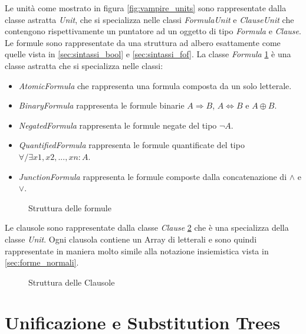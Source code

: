 \documentclass[./main.tex]{subfiles}
\begin{document}
Le unità come mostrato in figura \ref{fig:vampire_units} sono rappresentate dalla classe astratta \textit{Unit},
che si specializza nelle classi \textit{FormulaUnit} e \textit{ClauseUnit} che contengono rispettivamente un 
puntatore ad un oggetto di tipo \textit{Formula} e \textit{Clause}.
Le formule sono rappresentate da una struttura ad albero esattamente come quelle vista in \ref{sec:sintassi_bool} e \ref{sec:sintassi_fof}.
La classe \textit{Formula} \ref{fig:vampire_formulas} è una classe astratta che si specializza nelle classi:
\begin{itemize}
    \item \textit{AtomicFormula} che rappresenta una formula composta da un solo letterale.
    \item \textit{BinaryFormula} rappresenta le formule binarie $A \Rightarrow B$, $A \Leftrightarrow B$ e $A \oplus B$.
    \item \textit{NegatedFormula} rappresenta le formule negate del tipo $\lnot A$.
    \item \textit{QuantifiedFormula} rappresenta le formule quantificate del tipo $\forall/\exists x1, x2, ..., xn : A$.
    \item \textit{JunctionFormula} rappresenta le formule composte dalla concatenazione di $\land$ e $\lor$.
\end{itemize}

\begin{figure}[H]
    \centering
    \scalebox{0.5}{
        
    }
    \caption{Struttura delle formule}
    \label{fig:vampire_formulas}
\end{figure}

Le clausole sono rappresentate dalla classe \textit{Clause} \ref{fig:vampire_clauses} che è una specializza della classe \textit{Unit}.
Ogni clausola contiene un Array di letterali e sono quindi rappresentate in maniera molto simile alla notazione insiemistica 
vista in \ref{sec:forme_normali}.

\begin{figure}[H]
    \centering
    \scalebox{0.55}{
        
    }
    
    \caption{Struttura delle Clausole}
    \label{fig:vampire_clauses}
\end{figure}


\section{Unificazione e Substitution Trees} \label{sec:vampire_unification}
\end{document}
